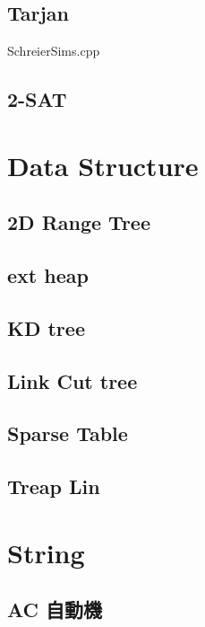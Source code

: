 \subsection{Tarjan}


SchreierSims.cpp
\subsection{2-SAT}



\section{Data Structure}

\subsection{2D Range Tree}

\subsection{ext heap}

\subsection{KD tree}

\subsection{Link Cut tree}

\subsection{Sparse Table}

\subsection{Treap Lin}



\section{String}

\subsection{AC 自動機}

